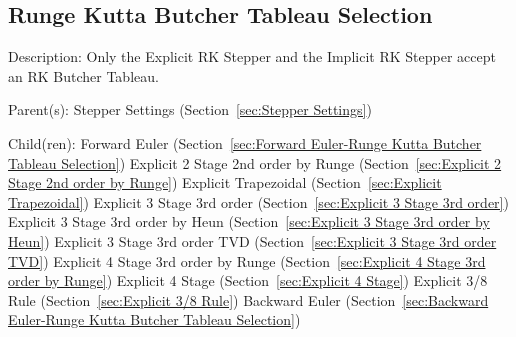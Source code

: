 \subsection{Runge Kutta Butcher Tableau Selection}
\label{sec:Runge Kutta Butcher Tableau Selection}

\begin{list}{}
  {\setlength{\leftmargin}{1.0in}
   \setlength{\labelwidth}{0.75in}
   \setlength{\labelsep}{0.125in}}
  \item[Description:]
    Only the Explicit RK Stepper and the Implicit RK Stepper accept an RK Butcher
    Tableau.
  \item[Parent(s):]
    Stepper Settings (Section~\ref{sec:Stepper Settings})
  \item[Child(ren):]
    Forward Euler (Section~\ref{sec:Forward Euler-Runge Kutta Butcher Tableau Selection})
      \newline 
    Explicit 2 Stage 2nd order by Runge (Section~\ref{sec:Explicit 2 Stage 2nd order by Runge})
      \newline 
    Explicit Trapezoidal (Section~\ref{sec:Explicit Trapezoidal})
      \newline 
    Explicit 3 Stage 3rd order (Section~\ref{sec:Explicit 3 Stage 3rd order})
      \newline 
    Explicit 3 Stage 3rd order by Heun (Section~\ref{sec:Explicit 3 Stage 3rd order by Heun})
      \newline 
    Explicit 3 Stage 3rd order TVD (Section~\ref{sec:Explicit 3 Stage 3rd order TVD})
      \newline 
    Explicit 4 Stage 3rd order by Runge (Section~\ref{sec:Explicit 4 Stage 3rd order by Runge})
      \newline 
    Explicit 4 Stage (Section~\ref{sec:Explicit 4 Stage})
      \newline 
    Explicit 3/8 Rule (Section~\ref{sec:Explicit 3/8 Rule})
      \newline 
    Backward Euler (Section~\ref{sec:Backward Euler-Runge Kutta Butcher Tableau Selection})

\end{list}
